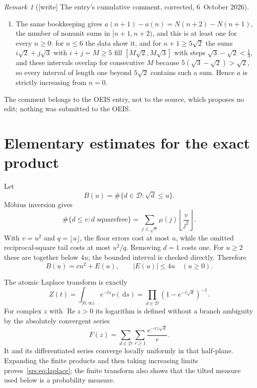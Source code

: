 \documentclass[11pt]{article}
\numberwithin{equation}{section}
\theoremstyle{remark}\newtheorem{remark}[theorem]{Remark}
\newcommand{\dd}{\,\mathrm d}
\newcommand{\Sf}{\mathcal D}
\DeclareMathOperator{\Ree}{Re}
\begin{document}
\begin{remark}[{[write]} The entry's cumulative comment, corrected, 6~October 2026]
\begin{enumerate}[label=(\alph*)]
{ non-equivalence does not follow from the value at $n=1$, where the two
 readings agree, with $3$ values with the empty sum and $2$ without. It
 follows from~\eqref{srs:eq:integermodel}: the two counts differ by
 $\sum_{i=0}^{n-2}a(i)\ge1$ for every $n\ge2$, with the same difference
 whether the empty sum is counted in both or in neither. The value
 $\mathcal I_1-1=2$ shows instead that without the empty sum the comment
 fails as a formula for $a(n)$ under either reading.)}
\item The same bookkeeping gives $a(n+1)-a(n)=N(n+2)-N(n+1)$, the number of
 nonunit sums in $[n+1,n+2)$, and this is at least one for every $n\ge0$:
 for $n\le6$ the data show it, and for $n+1\ge5\sqrt2$ the sums
 $i\sqrt2+j\sqrt3$ with $i+j=M\ge5$ fill $[M\sqrt2,M\sqrt3]$ with steps
 $\sqrt3-\sqrt2<\tfrac13$, and these intervals overlap for consecutive $M$
 because $5(\sqrt3-\sqrt2)>\sqrt2$, so every interval of length one beyond
 $5\sqrt2$ contains such a sum. Hence $a$ is strictly increasing from $n=0$.
\end{enumerate}
The comment belongs to the OEIS entry, not to the source, which proposes no
edit; nothing was submitted to the OEIS.
\end{remark}

\section{Elementary estimates for the exact product}\label{srs:sec:product}
Let
\[
 B(u)=\#\{d\in\Sf:\sqrt d\le u\}.
\]
M\"obius inversion gives
\begin{equation}
 \#\{d\le v:d\text{ squarefree}\}=\sum_{j\le\sqrt v}\mu(j)
 \left\lfloor\frac v{j^2}\right\rfloor.
\end{equation}
With $v=u^2$ and $q=\lfloor u\rfloor$, the floor errors cost at most $u$, while the omitted reciprocal-square tail costs at most $u^2/q$. Removing $d=1$ costs one. For $u\ge2$ these are together below $4u$; the bounded interval is checked directly. Therefore
\begin{equation}
 B(u)=cu^2+E(u),\qquad |E(u)|\le4u\quad(u\ge0).
 \label{srs:eq:B}
\end{equation}

The atomic Laplace transform is exactly
\begin{equation}
 Z(t)=\int_{[0,\infty)}e^{-ts}\nu(\dd s)
     =\prod_{d\in\Sf}(1-e^{-t\sqrt d})^{-1}.
 \label{srs:eq:laplace}
\end{equation}
For complex $z$ with $\Ree z>0$ its logarithm is defined without a branch ambiguity by the absolutely convergent series
\begin{equation}
 F(z)=\sum_{d\in\Sf}\sum_{r\ge1}\frac{e^{-rz\sqrt d}}r.
 \label{srs:eq:positive}
\end{equation}
It and its differentiated series converge locally uniformly in that half-plane. Expanding the finite products and then taking increasing limits proves~\eqref{srs:eq:laplace}; the finite transform also shows that the tilted measure used below is a probability measure.
\end{document}
